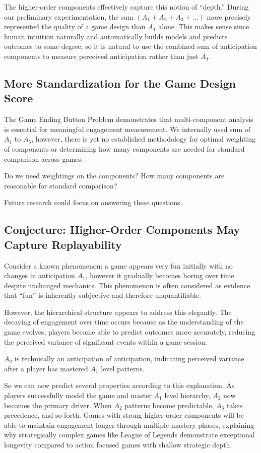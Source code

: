 \documentclass[manuscript,review,anonymous]{acmart}
\theoremstyle{definition}
\theoremstyle{plain}
\begin{document}
The higher-order components effectively capture this notion of ``depth.''
During our preliminary experimentation, the sum $(A_1 + A_2 + A_3 + \ldots)$ more precisely represented the quality of a game design than $A_1$ alone.
This makes sense since human intuition naturally and automatically builds models and predicts outcomes to some degree, so it is natural to use the combined sum of anticipation components to measure perceived anticipation rather than just $A_1$.

\subsection{More Standardization for the Game Design Score}
The Game Ending Button Problem demonstrates that multi-component analysis is essential for meaningful engagement measurement.
We internally used sum of $A_1$ to $A_5$, however, there is yet no established methodology for optimal weighting of components or determining how many components are needed for standard comparison across games.

Do we need weightings on the components? How many components are reasonable for standard comparison?

Future research could focus on answering these questions.

\subsection{Conjecture: Higher-Order Components May Capture Replayability}
Consider a known phenomenon: a game appears very fun initially with no changes in anticipation $A_1$, however it gradually becomes boring over time despite unchanged mechanics.
This phenomenon is often considered as evidence that ``fun'' is inherently subjective and therefore unquantifiable.

However, the hierarchical structure appears to address this elegantly.
The decaying of engagement over time occurs because as the understanding of the game evolves, players become able to predict outcomes more accurately, reducing the perceived variance of significant events within a game session.

$A_2$ is technically an anticipation of anticipation, indicating perceived variance after a player has mastered $A_1$ level patterns.

So we can now predict several properties according to this explanation.
As players successfully model the game and master $A_1$ level hierarchy, $A_2$ now becomes the primary driver.
When $A_2$ patterns become predictable, $A_3$ takes precedence, and so forth.
Games with strong higher-order components will be able to maintain engagement longer through multiple mastery phases, explaining why strategically complex games like League of Legends demonstrate exceptional longevity compared to action focused games with shallow strategic depth.
\end{document}

